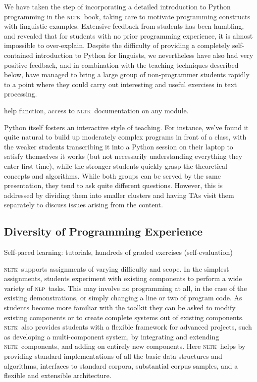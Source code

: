 \documentclass[11pt]{article}
\newcommand{\NLP}{\textsc{nlp}}
\newcommand{\NLTK}{\textsc{nltk}}
\begin{document}
We have taken the step of incorporating a detailed introduction to
Python programming in the \NLTK\ book, taking care to motivate
programming constructs with linguistic examples. Extensive feedback
from students has been humbling, and revealed that for students with
no prior programming experience, it is almost impossible to
over-explain. Despite the difficulty of providing a completely
self-contained introduction to Python for linguists, we nevertheless
have also had very positive feedback, and in combination with the
teaching techniques described below, have managed to bring a
large group of non-programmer students rapidly to a point where they
could carry out interesting and useful exercises in text processing.

help function, access to \NLTK\ documentation on any module.

Python itself fosters an
interactive style of teaching.  For instance, we've found it quite
natural to build up moderately complex programs in front of a class,
with the weaker students transcribing it into a Python session on
their laptop to satisfy themselves it works (but not necessarily
understanding everything they enter first time), while the stronger
students quickly grasp the theoretical concepts and algorithms.  While
both groups can be served by the same presentation, they tend to ask
quite different questions.  However, this is addressed by dividing
them into smaller clusters and having TAs visit them separately to
discuss issues arising from the content.

\subsection{Diversity of Programming Experience}

Self-paced learning: tutorials, hundreds of graded exercises (self-evaluation)



\NLTK\ supports assignments of varying difficulty and scope. In the
simplest assignments, students experiment with existing components to
perform a wide variety of \NLP\ tasks. This may involve no programming
at all, in the case of the existing demonstrations, or simply changing
a line or two of program code. As students become more familiar with
the toolkit they can be asked to modify existing components or to
create complete systems out of existing components. \NLTK\ also provides
students with a flexible framework for advanced projects, such as
developing a multi-component system, by integrating and extending \NLTK\
components, and adding on entirely new components. Here \NLTK\ helps by
providing standard implementations of all the basic data structures
and algorithms, interfaces to standard corpora, substantial corpus
samples, and a flexible and extensible architecture.
\end{document}
